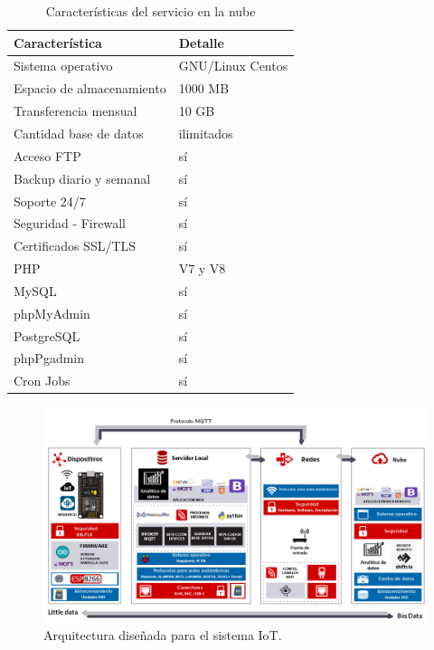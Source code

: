 \begin{table}[h]
	\centering
	\caption[Características del servicio en la nube]{Características del servicio en la nube}
	\begin{tabular}{p{7cm} p{5cm} }    
		\toprule
		\textbf{Característica} 	 & \textbf{Detalle}  \\
		\midrule
		Sistema operativo  & GNU/Linux Centos\\		
		Espacio de almacenamiento & 1000 MB \\
		Transferencia mensual  & 10 GB\\				
		Cantidad base de datos 	  & ilimitados\\
		Acceso FTP 	  & sí\\
		Backup diario y semanal 	  & sí\\
		Soporte 24/7 	  & sí\\
		Seguridad - Firewall	  & sí\\
		Certificados SSL/TLS	  & sí\\
		PHP	  & V7 y V8\\
		MySQL	  & sí\\
		phpMyAdmin	  & sí\\
		PostgreSQL	  & sí\\
		phpPgadmin	  & sí\\
		Cron Jobs	  & sí\\
		\bottomrule
		\hline
	\end{tabular}
	\label{tab:serverweb}
\end{table}

\vspace{0.5cm}
\begin{landscape} %
\begin{figure}[htpb]
\centering 
\includegraphics[width=1.65\textwidth]{./Figures/arquitectura-listo.png}
\caption{Arquitectura diseñada para el sistema IoT.}
\label{fig:arquitectura}
\end{figure}
\end{landscape} %

